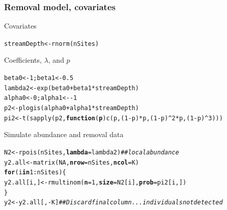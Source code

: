 \documentclass[color=usenames,dvipsnames]{beamer}\usepackage[]{graphicx}\usepackage[]{color}
\makeatletter
\newcommand{\hlnum}[1]{\textcolor[rgb]{0.69,0.494,0}{#1}}%
\newcommand{\hlcom}[1]{\textcolor[rgb]{0.514,0.506,0.514}{\textit{#1}}}%
\newcommand{\hlopt}[1]{\textcolor[rgb]{0,0,0}{#1}}%
\newcommand{\hlstd}[1]{\textcolor[rgb]{0,0,0}{#1}}%
\newcommand{\hlkwa}[1]{\textcolor[rgb]{0,0,0}{\textbf{#1}}}%
\newcommand{\hlkwb}[1]{\textcolor[rgb]{0,0.341,0.682}{#1}}%
\newcommand{\hlkwc}[1]{\textcolor[rgb]{0,0,0}{\textbf{#1}}}%
\newcommand{\hlkwd}[1]{\textcolor[rgb]{0.004,0.004,0.506}{#1}}%
\newenvironment{kframe}{%
 \def\at@end@of@kframe{}%
 \ifinner\ifhmode%
  \def\at@end@of@kframe{\end{minipage}}%
  \begin{minipage}{\columnwidth}%
 \fi\fi%
 \def\FrameCommand##1{\hskip\@totalleftmargin \hskip-\fboxsep
 \colorbox{shadecolor}{##1}\hskip-\fboxsep
     \hskip-\linewidth \hskip-\@totalleftmargin \hskip\columnwidth}%
 \MakeFramed {\advance\hsize-\width
   \@totalleftmargin\z@ \linewidth\hsize
   \@setminipage}}%
 {\par\unskip\endMakeFramed%
 \at@end@of@kframe}
\newenvironment{knitrout}{}{} %
\makeatother
\begin{document}
\begin{frame}[fragile]
  \frametitle{Removal model, covariates}
  \small
  Covariates
  \vspace{-6pt}
\begin{knitrout}\scriptsize
{}\color{fgcolor}\begin{kframe}
\begin{alltt}
\hlstd{streamDepth} \hlkwb{<-} \hlkwd{rnorm}\hlstd{(nSites)}
\end{alltt}
\end{kframe}
\end{knitrout}
\vfill
  Coefficients, $\lambda$, and $p$
  \vspace{-6pt}
\begin{knitrout}\scriptsize
{}\color{fgcolor}\begin{kframe}
\begin{alltt}
\hlstd{beta0} \hlkwb{<-} \hlnum{1}\hlstd{; beta1} \hlkwb{<-} \hlnum{0.5}
\hlstd{lambda2} \hlkwb{<-} \hlkwd{exp}\hlstd{(beta0} \hlopt{+} \hlstd{beta1}\hlopt{*}\hlstd{streamDepth)}
\hlstd{alpha0} \hlkwb{<-} \hlnum{0}\hlstd{; alpha1} \hlkwb{<-} \hlopt{-}\hlnum{1}
\hlstd{p2} \hlkwb{<-} \hlkwd{plogis}\hlstd{(alpha0} \hlopt{+} \hlstd{alpha1}\hlopt{*}\hlstd{streamDepth)}
\hlstd{pi2} \hlkwb{<-} \hlkwd{t}\hlstd{(}\hlkwd{sapply}\hlstd{(p2,} \hlkwa{function}\hlstd{(}\hlkwc{p}\hlstd{)} \hlkwd{c}\hlstd{(p, (}\hlnum{1}\hlopt{-}\hlstd{p)}\hlopt{*}\hlstd{p, (}\hlnum{1}\hlopt{-}\hlstd{p)}\hlopt{^}\hlnum{2}\hlopt{*}\hlstd{p, (}\hlnum{1}\hlopt{-}\hlstd{p)}\hlopt{^}\hlnum{3}\hlstd{)))}
\end{alltt}
\end{kframe}
\end{knitrout}
\vfill
  Simulate abundance and removal data
  \vspace{-6pt}
\begin{knitrout}\scriptsize
{}\color{fgcolor}\begin{kframe}
\begin{alltt}
\hlstd{N2} \hlkwb{<-} \hlkwd{rpois}\hlstd{(nSites,} \hlkwc{lambda}\hlstd{=lambda2)}         \hlcom{## local abundance }
\hlstd{y2.all} \hlkwb{<-} \hlkwd{matrix}\hlstd{(}\hlnum{NA}\hlstd{,} \hlkwc{nrow}\hlstd{=nSites,} \hlkwc{ncol}\hlstd{=K)}
\hlkwa{for}\hlstd{(i} \hlkwa{in} \hlnum{1}\hlopt{:}\hlstd{nSites) \{}
    \hlstd{y2.all[i,]} \hlkwb{<-} \hlkwd{rmultinom}\hlstd{(}\hlkwc{n}\hlstd{=}\hlnum{1}\hlstd{,} \hlkwc{size}\hlstd{=N2[i],} \hlkwc{prob}\hlstd{=pi2[i,])}
\hlstd{\}}
\hlstd{y2} \hlkwb{<-} \hlstd{y2.all[,}\hlopt{-}\hlstd{K]} \hlcom{## Discard final column... individuals not detected}
\end{alltt}
\end{kframe}
\end{knitrout}
\end{frame}
\end{document}
